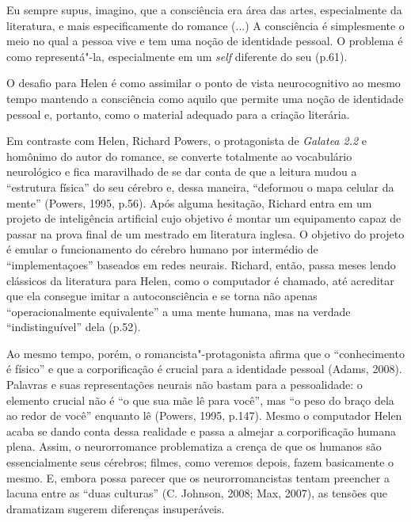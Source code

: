 Eu sempre supus, imagino, que a consciência era área das artes,
especialmente da literatura, e mais especificamente do romance (...) A
consciência é simplesmente o meio no qual a pessoa vive e tem uma noção
de identidade pessoal. O problema é como representá"-la, especialmente em
um \emph{self} diferente do seu (p.61).

O desafio para Helen é como assimilar o ponto de vista neurocognitivo ao
mesmo tempo mantendo a consciência como aquilo que permite uma noção de
identidade pessoal e, portanto, como o material adequado para a criação
literária.

Em contraste com Helen, Richard Powers, o protagonista de \emph{Galatea
2.2} e homônimo do autor do romance, se converte totalmente ao
vocabulário neurológico e fica maravilhado de se dar conta de que a
leitura mudou a ``estrutura física'' do seu cérebro e, dessa maneira,
``deformou o mapa celular da mente'' (Powers, 1995, p.56). Após alguma
hesitação, Richard entra em um projeto de inteligência artificial cujo
objetivo é montar um equipamento capaz de passar na prova final de um
mestrado em literatura inglesa. O objetivo do projeto é emular o
funcionamento do cérebro humano por intermédio de ``implementaçoes''
baseados em redes neurais. Richard, então, passa meses lendo clássicos
da literatura para Helen, como o computador é chamado, até acreditar que
ela consegue imitar a autoconsciência e se torna não apenas
``operacionalmente equivalente'' a uma mente humana, mas na verdade
``indistinguível'' dela (p.52).

Ao mesmo tempo, porém, o romancista"-protagonista afirma que o
``conhecimento é físico'' e que a corporificação é crucial para a
identidade pessoal (Adams, 2008). Palavras e suas representações neurais
não bastam para a pessoalidade: o elemento crucial não é ``o que sua mãe
lê para você'', mas ``o peso do braço dela ao redor de você'' enquanto
lê (Powers, 1995, p.147). Mesmo o computador Helen acaba se dando conta
dessa realidade e passa a almejar a corporificação humana plena. Assim,
o neurorromance problematiza a crença de que os humanos são
essencialmente seus cérebros; filmes, como veremos depois, fazem
basicamente o mesmo. E, embora possa parecer que os neurorromancistas
tentam preencher a lacuna entre as ``duas culturas'' (C. Johnson, 2008;
Max, 2007), as tensões que dramatizam sugerem diferenças insuperáveis.

